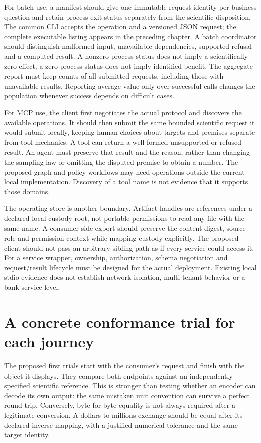 For batch use, a manifest should give one immutable request identity per
business question and retain process exit status separately from the
scientific disposition. The common CLI accepts the operation and a versioned
JSON request; the complete executable listing appears in the preceding
chapter. A batch coordinator should distinguish malformed input, unavailable
dependencies, supported refusal and a computed result. A nonzero process
status does not imply a scientifically zero effect; a zero process status
does not imply identified benefit. The aggregate report must keep counts of
all submitted requests, including those with unavailable results. Reporting
average value only over successful calls changes the population whenever
success depends on difficult cases.

For MCP use, the client first negotiates the actual protocol and discovers
the available operations. It should then submit the same bounded scientific
request it would submit locally, keeping human choices about targets and
premises separate from tool mechanics. A tool can return a well-formed
unsupported or refused result. An agent must preserve that result and the
reason, rather than changing the sampling law or omitting the disputed
premise to obtain a number. The proposed graph and policy workflows may
need operations outside the current local implementation. Discovery of a
tool name is not evidence that it supports those domains.

The operating store is another boundary. Artifact handles are references
under a declared local custody root, not portable permissions to read any
file with the same name. A consumer-side export should preserve the content
digest, source role and permission context while mapping custody explicitly.
The proposed client should not pass an arbitrary sibling path as if every
service could access it. For a service wrapper, ownership, authorization,
schema negotiation and request/result lifecycle must be designed for the
actual deployment. Existing local stdio evidence does not establish network
isolation, multi-tenant behavior or a bank service level.

\section{A concrete conformance trial for each journey}

The proposed first trials start with the consumer's request and finish with
the object it displays. They compare both endpoints against an independently
specified scientific reference. This is stronger than testing whether an
encoder can decode its own output: the same mistaken unit convention can
survive a perfect round trip. Conversely, byte-for-byte equality is not always
required after a legitimate conversion. A dollars-to-millions exchange should
be equal after its declared inverse mapping, with a justified numerical
tolerance and the same target identity.

